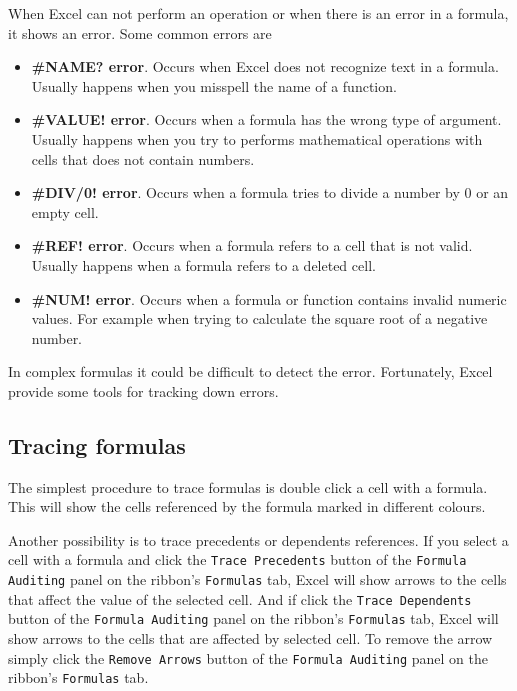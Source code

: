 When Excel can not perform an operation or when there is an error in a formula, it shows an error. Some common errors are

\begin{itemize}
\item \textbf{\#NAME? error}. Occurs when Excel does not recognize text in a formula. Usually happens when you misspell the name of a function.
\item \textbf{\#VALUE! error}. Occurs when a formula has the wrong type of argument. Usually happens when you try to performs mathematical operations with cells that does not contain numbers.
\item \textbf{\#DIV/0! error}. Occurs when a formula tries to divide a number by 0 or an empty cell.
\item \textbf{\#REF! error}. Occurs when a formula refers to a cell that is not valid. Usually happens when a formula refers to a deleted cell.
\item \textbf{\#NUM! error}. Occurs when a formula or function contains invalid numeric values. For example when trying to calculate the square root of a negative number.
\end{itemize}

In complex formulas it could be difficult to detect the error. Fortunately, Excel provide some tools for tracking down errors.

\subsection{Tracing formulas}\hypertarget{tracing-formulas}{}\label{tracing-formulas}

The simplest procedure to trace formulas is double click a cell with a formula. This will show the cells referenced by the formula marked in different colours.

Another possibility is to trace precedents or dependents references. If you select a cell with a formula and click the \texttt{Trace Precedents} button of the \texttt{Formula Auditing} panel on the ribbon's \texttt{Formulas} tab, Excel will show arrows to the cells that affect the value of the selected cell. And if click the \texttt{Trace Dependents} button of the \texttt{Formula Auditing} panel on the ribbon's \texttt{Formulas} tab, Excel will show arrows to the cells that are affected by selected cell. To remove the arrow simply click the \texttt{Remove Arrows} button of the \texttt{Formula Auditing} panel on the ribbon's \texttt{Formulas} tab.

